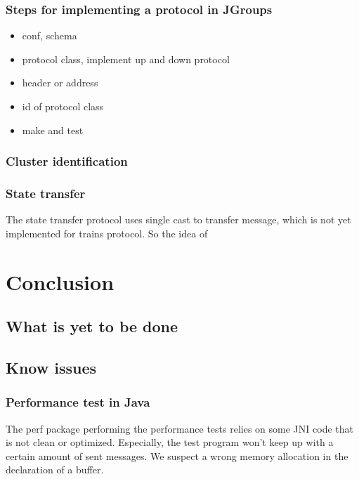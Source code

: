 \documentclass[a4paper,10pt]{report}
\begin{document}
\subsection{Steps for implementing a protocol in JGroups}
\begin{itemize}
\item conf, schema
\item protocol class, implement up and down protocol
\item header or address
\item id of protocol class
\item make and test
\end{itemize}

\subsection{Cluster identification}

\subsection{State transfer}
The state transfer protocol uses single cast to transfer message, which is not yet
implemented for trains protocol. So the idea of

\chapter{Conclusion}

\section{}

\section{What is yet to be done}
\section{Know issues}

\subsection{Performance test in Java}

The perf package performing the performance tests relies on some JNI code that is not clean or optimized. Especially, the test program won't keep up with a certain amount of sent messages. We suspect a wrong memory allocation in the declaration of a buffer.
\end{document}
